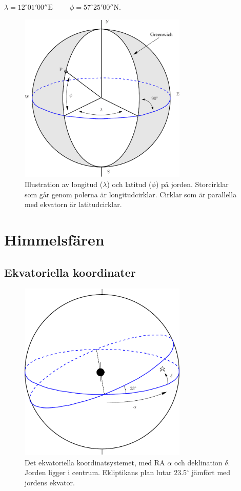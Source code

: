 \begin{center}
${{\boxed{\lambda=12^{\circ}01'00'' \text{E}
\hspace{1cm}\phi=57^{\circ}25'00''\text{N.} }}}$
\end{center}  

\begin{figure}[ht]
\begin{center}
\includegraphics[width=8cm]{../figures/longlat.pdf}
\end{center}
\caption{Illustration av longitud ($\lambda$) och latitud ($\phi$) på
  jorden. Storcirklar som går genom polerna är
  longitudcirklar. Cirklar som är parallella med ekvatorn är
  latitudcirklar. }
\label{figearth}
\end{figure}


\section{Himmelsfären}

\subsection{Ekvatoriella koordinater}

\begin{figure}[ht]
\begin{center}
\includegraphics[width=8cm]{../figures/celestial.pdf}
\end{center}
\caption{Det ekvatoriella koordinatsystemet, med RA $\alpha$ och
  deklination $\delta$. Jorden ligger i centrum. Ekliptikans plan
  lutar 23.5$^\circ$ jämfört med jordens ekvator.}
\label{figcelest}
\end{figure}

